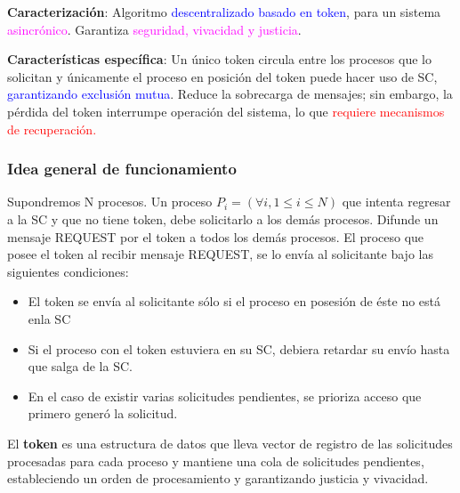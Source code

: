 \textbf{Caracterización}: Algoritmo \textcolor{blue}{descentralizado basado en token}, para un sistema \textcolor{magenta}{asincrónico}. Garantiza \textcolor{magenta}{seguridad, vivacidad y justicia}.

\textbf{Características específica}: Un único token circula entre los procesos que lo solicitan y únicamente el proceso en posición del token puede hacer uso de SC, \textcolor{blue}{garantizando exclusión mutua}. Reduce la sobrecarga de mensajes; sin embargo, la pérdida del token interrumpe operación del sistema, lo que \textcolor{red}{requiere mecanismos de recuperación.}

\subsubsection{Idea general de funcionamiento}

Supondremos N procesos. Un proceso $P_i = (\forall i, 1 \leq i \leq N)$ que intenta regresar a la SC y que no tiene token, debe solicitarlo a los demás procesos. Difunde un mensaje REQUEST por el token a todos los demás procesos. El proceso que posee el token al recibir mensaje REQUEST, se lo envía al solicitante bajo las siguientes condiciones: 
\begin{itemize}
    \item El token se envía al solicitante sólo si el proceso en posesión de éste no está enla SC
    \item Si el proceso con el token estuviera en su SC, debiera retardar su envío hasta que salga de la SC.
    \item En el caso de existir varias solicitudes pendientes, se prioriza acceso que primero generó la solicitud.
\end{itemize}

El \textbf{token} es una estructura de datos que lleva  vector de registro de las solicitudes procesadas para cada proceso y mantiene una cola de solicitudes pendientes, estableciendo un orden de procesamiento y garantizando justicia y vivacidad.

